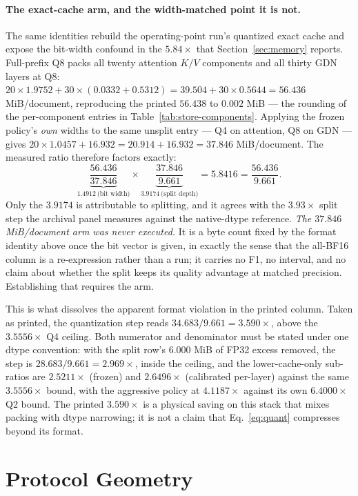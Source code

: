\documentclass{article}
\begin{document}
\paragraph{The exact-cache arm, and the width-matched point it is not.}
The same identities rebuild the operating-point run's quantized exact cache and
expose the bit-width confound in the $5.84\times$ that Section~\ref{sec:memory}
reports.  Full-prefix Q8 packs all twenty attention $K/V$ components and all
thirty GDN layers at Q8:
$20\times1.9752+30\times(0.0332+0.5312)=39.504+30\times0.5644=56.436$ MiB/document,
reproducing the printed $56.438$ to $0.002$ MiB --- the rounding of the
per-component entries in Table~\ref{tab:store-components}.  Applying the frozen
policy's \emph{own} widths to the same unsplit entry --- Q4 on attention, Q8 on
GDN --- gives $20\times1.0457+16.932=20.914+16.932=37.846$ MiB/document.  The
measured ratio therefore factors exactly:
\[
  \underbrace{\frac{56.436}{37.846}}_{1.4912\ \text{(bit width)}}\times
  \underbrace{\frac{37.846}{9.661}}_{3.9174\ \text{(split depth)}}
  =5.8416=\frac{56.436}{9.661}.
\]
Only the $3.9174$ is attributable to splitting, and it agrees with the
$3.93\times$ split step the archival panel measures against the native-dtype
reference.  \emph{The $37.846$ MiB/document arm was never executed.}  It is a
byte count fixed by the format identity above once the bit vector is given, in
exactly the sense that the all-BF16 column is a re-expression rather than a run;
it carries no F1, no interval, and no claim about whether the split keeps its
quality advantage at matched precision.  Establishing that requires the arm.

This is what dissolves the apparent format violation in the printed column.
Taken as printed, the quantization step reads $34.683/9.661=3.590\times$, above
the $3.5556\times$ Q4 ceiling.  Both numerator and denominator must be stated
under one dtype convention: with the split row's $6.000$ MiB of FP32 excess
removed, the step is $28.683/9.661=2.969\times$, inside the ceiling, and the
lower-cache-only sub-ratios are $2.5211\times$ (frozen) and $2.6496\times$
(calibrated per-layer) against the same $3.5556\times$ bound, with the aggressive policy
at $4.1187\times$ against its own $6.4000\times$ Q2 bound.  The printed
$3.590\times$ is a physical saving on this stack that mixes packing with dtype
narrowing; it is not a claim that Eq.~\ref{eq:quant} compresses beyond its format.

\section{Protocol Geometry}
\label{app:protocol-geometry}
\end{document}
